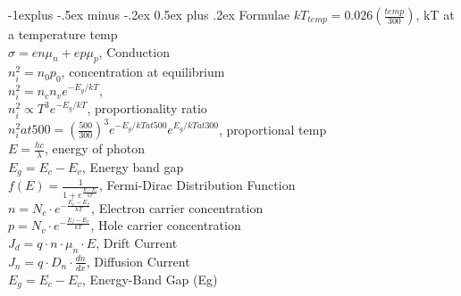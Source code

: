 \documentclass[10pt,landscape]{article}
\makeatletter
\renewcommand{\subsection}{\@startsection{subsection}{2}{0mm}%
                                {-1explus -.5ex minus -.2ex}%
                                {0.5ex plus .2ex}%
                                {\normalfont\normalsize\bfseries}}
\makeatother
\begin{document}
\begin{multicols}{3}
\subsection{Formulae}
$kT_{temp} = 0.026 (\frac{temp}{300})$, kT at a temperature temp\\
$\sigma = en\mu_n + ep\mu_p$, Conduction\\
$ n_i^2 = n_0 p_0$, concentration at equilibrium\\
$ n_i^2 = n_c n_v e^{-E_g/kT}$, \\
$n_i^2 \propto T^3 e^{-E_g/kT}$, proportionality ratio\\
$n_i^2 at {500} =(\frac{500}{300})^3 e^{-E_g/kT at 500} e^{E_g/kT at 300}$, proportional temp\\
$E = \frac{hc}{\lambda}$, energy of photon\\
$E_g = E_c - E_v$, Energy band gap\\
$f(E) = \frac{1}{1 + e^{\frac{E - E_f}{kT}}}$,  Fermi-Dirac Distribution Function\\
$n = N_c \cdot e^{-\frac{E_c - E_f}{kT}}$, Electron carrier concentration\\
$p = N_v \cdot e^{-\frac{E_f - E_v}{kT}}$, Hole carrier concentration\\
$J_d = q \cdot n \cdot \mu_n \cdot E$, Drift Current\\
$J_n = q \cdot D_n \cdot \frac{dn}{dx}$, Diffusion Current\\
$E_g = E_c - E_v$, Energy-Band Gap (Eg)


\end{multicols}
\end{document}
